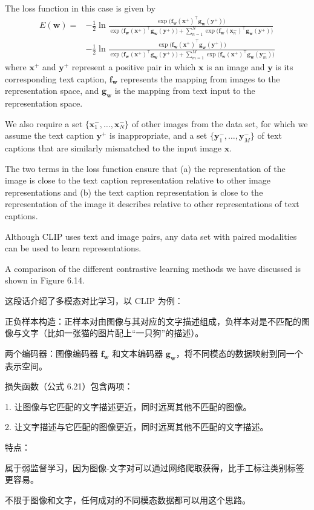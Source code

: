 \documentclass{article}
\begin{document}
The loss function in this case is given by
\begin{align}
    E(\mathbf{w}) = &-\frac{1}{2} \ln \frac{
        \exp\bigl(\mathbf{f}_{\mathbf{w}}(\mathbf{x}^+)^\top \mathbf{g}_{\mathbf{w}}(\mathbf{y}^+)\bigr)
    }{
        \exp\bigl(\mathbf{f}_{\mathbf{w}}(\mathbf{x}^+)^\top \mathbf{g}_{\mathbf{w}}(\mathbf{y}^+)\bigr) + \sum_{n=1}^{N} \exp\bigl(\mathbf{f}_{\mathbf{w}}(\mathbf{x}_n^-)^\top \mathbf{g}_{\mathbf{w}}(\mathbf{y}^+)\bigr)
    } \nonumber \\
    &-\frac{1}{2} \ln \frac{
        \exp\bigl(\mathbf{f}_{\mathbf{w}}(\mathbf{x}^+)^\top \mathbf{g}_{\mathbf{w}}(\mathbf{y}^+)\bigr)
    }{
        \exp\bigl(\mathbf{f}_{\mathbf{w}}(\mathbf{x}^+)^\top \mathbf{g}_{\mathbf{w}}(\mathbf{y}^+)\bigr) + \sum_{m=1}^{M} \exp\bigl(\mathbf{f}_{\mathbf{w}}(\mathbf{x}^+)^\top \mathbf{g}_{\mathbf{w}}(\mathbf{y}_m^-)\bigr)
    }
    \tag{6.21}
\end{align}
where $\mathbf{x}^+$ and $\mathbf{y}^+$ represent a positive pair in which $\mathbf{x}$ is an image and $\mathbf{y}$ is its corresponding text caption, $\mathbf{f}_{\mathbf{w}}$ represents the mapping from images to the representation space, and $\mathbf{g}_{\mathbf{w}}$ is the mapping from text input to the representation space. 

We also require a set $\{\mathbf{x}_1^-, \dots, \mathbf{x}_N^-\}$ of other images from the data set, for which we assume the text caption $\mathbf{y}^+$ is inappropriate, and a set $\{\mathbf{y}_1^-, \dots, \mathbf{y}_M^-\}$ of text captions that are similarly mismatched to the input image $\mathbf{x}$. 

The two terms in the loss function ensure that (a) the representation of the image is close to the text caption representation relative to other image representations and (b) the text caption representation is close to the representation of the image it describes relative to other representations of text captions. 

Although CLIP uses text and image pairs, any data set with paired modalities can be used to learn representations. 

A comparison of the different contrastive learning methods we have discussed is shown in Figure 6.14.

{\color{red}
这段话介绍了多模态对比学习，以 CLIP 为例：

正负样本构造：正样本对由图像与其对应的文字描述组成，负样本对是不匹配的图像与文字（比如一张猫的图片配上“一只狗”的描述）。

两个编码器：图像编码器 \( \mathbf{f}_{\mathbf{w}} \) 和文本编码器 \( \mathbf{g}_{\mathbf{w}} \)，将不同模态的数据映射到同一个表示空间。

损失函数（公式 6.21）包含两项：

1. 让图像与它匹配的文字描述更近，同时远离其他不匹配的图像。

2. 让文字描述与它匹配的图像更近，同时远离其他不匹配的文字描述。

特点：

属于弱监督学习，因为图像-文字对可以通过网络爬取获得，比手工标注类别标签更容易。

不限于图像和文字，任何成对的不同模态数据都可以用这个思路。
}
\end{document}
